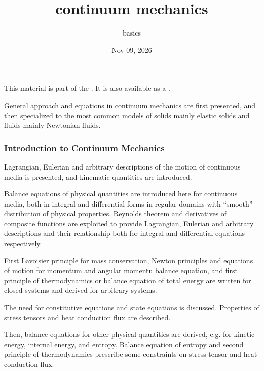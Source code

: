 \documentclass[letterpaper,10pt,english]{jupyterBook}
\title{continuum mechanics}
\date{Nov 09, 2026}
\author{basics}
\begin{document}
\pagestyle{empty}
\sphinxmaketitle
\pagestyle{plain}
\sphinxtableofcontents
\pagestyle{normal}
\label{\detokenize{intro::doc}}


\sphinxAtStartPar
This material is part of the . It is also available as a .

\sphinxAtStartPar
{}

\sphinxAtStartPar
General approach and equations in continuum mechanics are first presented, and then specialized to the most common models of solids \sphinxhyphen{} mainly elastic solids \sphinxhyphen{} and fluids \sphinxhyphen{} mainly Newtonian fluids.
\subsubsection*{Introduction to Continuum Mechanics}

\sphinxAtStartPar
{} Lagrangian, Eulerian and arbitrary descriptions of the motion of continuous media is presented, and kinematic quantities are introduced.

\sphinxAtStartPar
{} Balance equations of physical quantities are introduced here for continuous media, both in integral and differential forms \sphinxhyphen{} in regular domains with “smooth” distribution of physical properties. Reynolds theorem and derivatives of composite functions are exploited to provide Lagrangian, Eulerian and arbitrary descriptions \sphinxhyphen{} and their relationship \sphinxhyphen{} both for integral and differential equations respectively.

\sphinxAtStartPar
First Lavoisier principle for mass conservation, Newton principles and equations of motion for momentum and angular momentu balance equation, and first principle of thermodynamics or balance equation of total energy are written for closed systems \sphinxhyphen{} and derived for arbitrary systems.

\sphinxAtStartPar
The need for constitutive equations and state equations is discussed. Properties of stress tensors and heat conduction flux are described.

\sphinxAtStartPar
Then, balance equations for other physical quantities are derived, e.g. for kinetic energy, internal energy, and entropy. Balance equation of entropy and second principle of thermodynamics prescribe some constraints on stress tensor and heat conduction flux.
\end{document}
